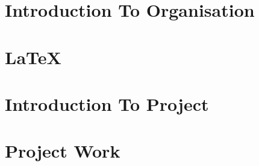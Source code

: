 \documentclass[12pt]{report}
\begin{document}

\begin{screen}
\ppttitle
\end{screen}
\footskip 0.7cm
\thispagestyle{empty} 
\pagetitle
\newpage
{}
\cfoot{\thepage}


\newpage



\newpage
\tableofcontents
\newpage
\listoffigures
\newpage

\cfoot{\thepage}

\newpage
\chapter{Introduction To Organisation}

\newpage
\chapter{\LaTeX}

\chapter{Introduction To Project}




%
\chapter{Project Work}



%
%
%
%
%
\end{document}
